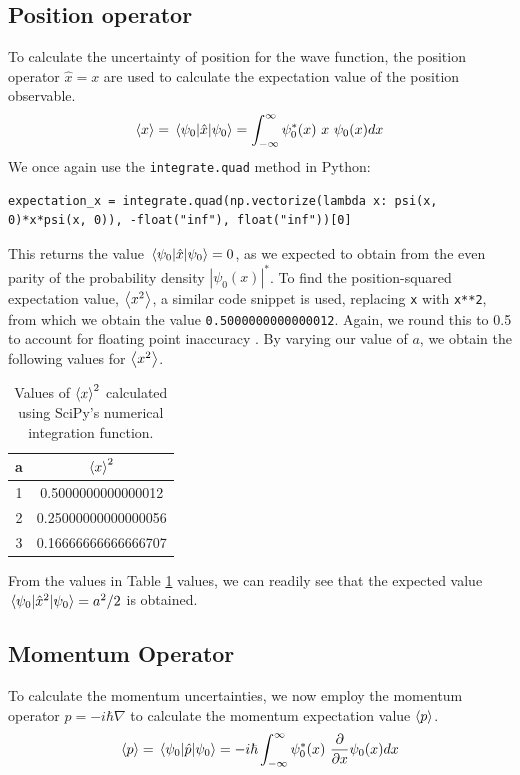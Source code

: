 \documentclass[a4paper]{article}
\begin{document}
\subsection{Position operator} \label{section:position}
To calculate the uncertainty of position for the wave function, the position operator $\hat x=x$ are used to calculate the expectation value of the position observable. 
\begin{equation}
\expval x=\mel{\psi_0}{\hat x}{\psi_0}=\int^\infty_{-\infty}\psi_0^*(x)\ x\ \psi_0(x)dx
\end{equation}
We once again use the \lstinline$integrate.quad$ method in Python:
\begin{lstlisting}
expectation_x = integrate.quad(np.vectorize(lambda x: psi(x, 0)*x*psi(x, 0)), -float("inf"), float("inf"))[0]
\end{lstlisting} This returns the value $\mel{\psi_0}{\hat x}{\psi_0}=0$, as we expected to obtain from the even parity of the probability density $|\psi_0(x)|^*$.
To find the position-squared expectation value, $\expval{x^2}$, a similar code snippet is used, replacing \lstinline$x$ with \lstinline$x**2$, from which we obtain the value \lstinline$0.5000000000000012$. Again, we round this to 0.5 to account for floating point inaccuracy . By varying our value of $a$, we obtain the following values for $\expval{x^2}$.
\begin{table}[h!]
\centering
\begin{tabular}{cc}
a & $\expval x^2$ \\ \hline
1 & 0.5000000000000012  \\
2 & 0.25000000000000056 \\
3 & 0.16666666666666707
\end{tabular}
\caption{\label{tab:expect}Values of $\expval x^2$ calculated using SciPy's numerical integration function.}
\end{table}

From the values in Table \ref{tab:expect} values, we can readily see that the expected value $\mel{\psi_0}{\hat x^2}{\psi_0} = a^2/2$ is obtained.

\subsection{Momentum Operator} \label{section:momentum}
To calculate the momentum uncertainties, we now employ the momentum operator $\hat p=-i\hbar\nabla$ to calculate the momentum expectation value $\expval p$.
\begin{equation}
\expval p=\mel{\psi_0}{\hat p}{\psi_0}=-i\hbar\int^\infty_{-\infty}\psi_0^*(x)\ \frac\partial{\partial x} \psi_0(x)dx
\end{equation}
\end{document}
